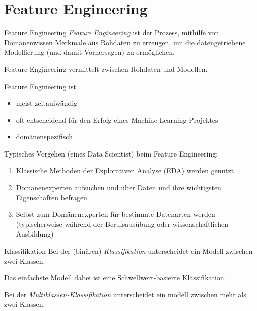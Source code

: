 \section{Feature Engineering}

\begin{defi}{Feature Engineering}
    \emph{Feature Engineering} ist der Prozess, mithilfe von Domänenwissen Merkmale aus Rohdaten zu erzeugen, um die datengetriebene Modellierung (und damit Vorhersagen) zu ermöglichen.

    Feature Engineering vermittelt zwischen Rohdaten und Modellen.

    Feature Engineering ist
    \begin{itemize}
        \item meist zeitaufwändig
        \item oft entscheidend für den Erfolg eines Machine Learning Projektes
        \item domänenspezifisch
    \end{itemize}

    Typisches Vorgehen (eines Data Scientist) beim Feature Engineering:
    \begin{enumerate}
        \item Klassische Methoden der Explorativen Analyse (EDA) werden genutzt
        \item Domänenexperten aufsuchen und über Daten und ihre wichtigsten Eigenschaften befragen
        \item Selbst zum Domänenexperten für bestimmte Datenarten werden (typischerweise während der Berufsausübung oder wissenschaftlichen Ausbildung)
    \end{enumerate}
\end{defi}

\begin{defi}{Klassifikation}
    Bei der (binären) \emph{Klassifikation} unterscheidet ein Modell zwischen zwei Klassen.

    Das einfachste Modell dabei ist eine Schwellwert-basierte Klassifikation.

    Bei der \emph{Multiklassen-Klassifikation} unterscheidet ein modell zwischen mehr als zwei Klassen.
\end{defi}

